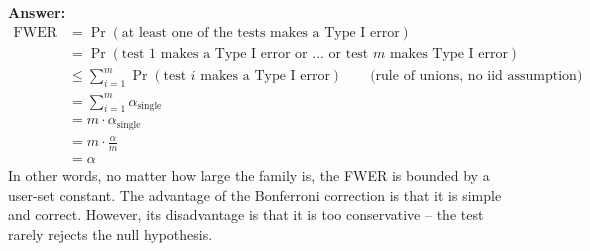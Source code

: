 \documentclass{article}
\newenvironment{QandA}{\begin{enumerate}[label=\arabic*.]}{\end{enumerate}}
\newenvironment{InnerQandA}{\begin{enumerate}[label=\roman*.]}{\end{enumerate}}
\newenvironment{answer}{\par\normalfont \textbf{Answer:}}{}
\begin{document}
\begin{QandA}
\begin{InnerQandA}
\begin{answer}
            \begin{align*}
                \text{FWER} &= \Pr (\text{at least one of the tests makes a Type I error}) \\
                &= \Pr(\text{test } 1 \text{ makes a Type I error or }\ldots \text{ or test } m \text{ makes Type I error}) \\
                &\le \sum_{i=1}^m \Pr (\text{test } i \text{ makes a Type I error}) \quad\quad \text{(rule of unions, no iid assumption)} \\
                &= \sum_{i=1}^m \alpha_{\text{single}} \\
                &= m \cdot \alpha_{\text{single}} \\
                &= m \cdot \frac{\alpha}{m} \\
                &= \alpha
            \end{align*}
            In other words, no matter how large the family is, the FWER is bounded by a user-set constant. The advantage of the Bonferroni correction is that it is simple and correct. However, its disadvantage is that it is too conservative -- the test rarely rejects the null hypothesis.
        \end{answer}
    \end{InnerQandA}


\end{QandA}
\end{document}
